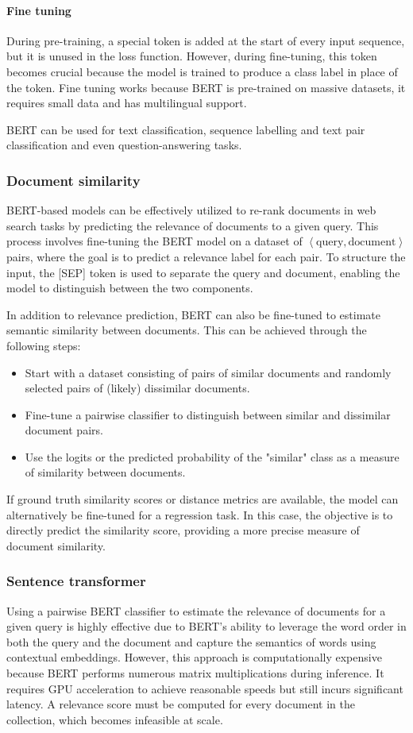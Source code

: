 \paragraph*{Fine tuning}
During pre-training, a special token is added at the start of every input sequence, but it is unused in the loss function. 
However, during fine-tuning, this token becomes crucial because the model is trained to produce a class label in place of the token.
Fine tuning works because BERT is pre-trained on massive datasets, it requires small data and has multilingual support. 

BERT can be used for text classification, sequence labelling and text pair classification and even question-answering tasks. 

\subsubsection{Document similarity}
BERT-based models can be effectively utilized to re-rank documents in web search tasks by predicting the relevance of documents to a given query.
This process involves fine-tuning the BERT model on a dataset of $\left\langle\text{query},\text{document}\right\rangle$ pairs, where the goal is to predict a relevance label for each pair.
To structure the input, the [SEP] token is used to separate the query and document, enabling the model to distinguish between the two components.

In addition to relevance prediction, BERT can also be fine-tuned to estimate semantic similarity between documents. 
This can be achieved through the following steps:
\begin{itemize}
    \item Start with a dataset consisting of pairs of similar documents and randomly selected pairs of (likely) dissimilar documents.
    \item Fine-tune a pairwise classifier to distinguish between similar and dissimilar document pairs.
    \item Use the logits or the predicted probability of the "similar" class as a measure of similarity between documents.
\end{itemize}
\noindent If ground truth similarity scores or distance metrics are available, the model can alternatively be fine-tuned for a regression task.
In this case, the objective is to directly predict the similarity score, providing a more precise measure of document similarity.

\subsubsection{Sentence transformer}
Using a pairwise BERT classifier to estimate the relevance of documents for a given query is highly effective due to BERT's ability to leverage the word order in both the query and the document and capture the semantics of words using contextual embeddings.
However, this approach is computationally expensive because BERT performs numerous matrix multiplications during inference.
It requires GPU acceleration to achieve reasonable speeds but still incurs significant latency.
A relevance score must be computed for every document in the collection, which becomes infeasible at scale.

